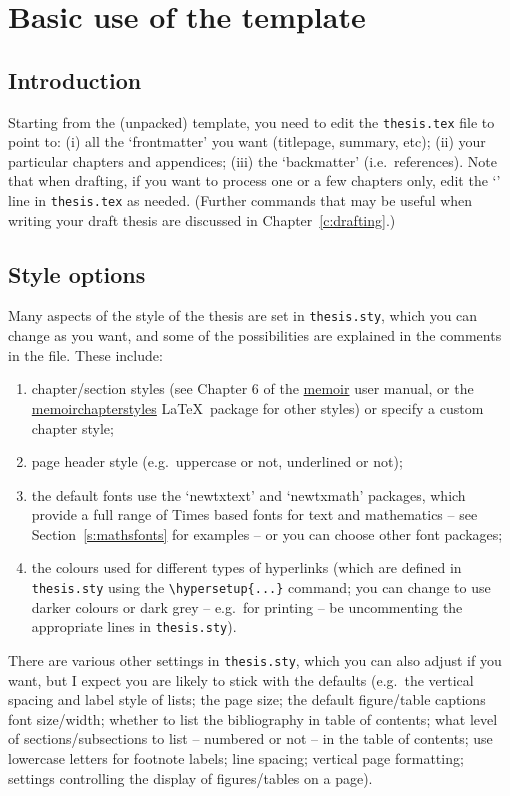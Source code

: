 \chapter{Basic use of the template}\label{c:first}

\section{Introduction}\label{s:firstfirst}

Starting from the (unpacked) template, you need to edit the
\verb|thesis.tex| file to point to: (i) all the `frontmatter' you want
(titlepage, summary, etc); (ii) your particular chapters and appendices;
(iii) the `backmatter' (i.e.\ references). Note that when drafting, if
you want to process one or a few chapters only, edit the
`\verb||' line in \verb|thesis.tex| as needed. (Further
commands that may be useful when writing your draft thesis are discussed
in Chapter~\ref{c:drafting}.)

\section{Style options}

Many aspects of the style of the thesis are set in \verb|thesis.sty|,
which you can change as you want, and some of the possibilities are
explained in the comments in the file. These include:
%
\begin{enumerate}
%
\item chapter/section styles (see Chapter 6 of the
\href{http://www.ctan.org/pkg/memoir}{memoir} user manual, or the
\href{http://www.ctan.org/pkg/memoirchapterstyles}{memoirchapterstyles}
\LaTeX\ package for other styles) or specify a custom chapter style;
%
\item page header style (e.g.\ uppercase or not, underlined or not);
%
\item the default fonts use the `newtxtext' and `newtxmath' packages,
which provide a full range of Times based fonts for text and mathematics
-- see Section~\ref{s:mathsfonts} for examples -- or you can choose
other font packages;
%
\item the colours used for different types of hyperlinks (which are
defined in \verb|thesis.sty| using the \verb|\hypersetup{...}| command;
you can change to use darker colours or dark grey -- e.g.\ for
printing -- be uncommenting the appropriate lines in \verb|thesis.sty|).
%
\end{enumerate}
%
There are various other settings in \verb|thesis.sty|, which you can
also adjust if you want, but I expect you are likely to stick with the
defaults (e.g.\ the vertical spacing and label style of lists; the page
size; the default figure/table captions font size/width; whether to list
the bibliography in table of contents; what level of
sections/subsections to list -- numbered or not -- in the table of
contents; use lowercase letters for footnote labels; line spacing;
vertical page formatting; settings controlling the display of
figures/tables on a page).

